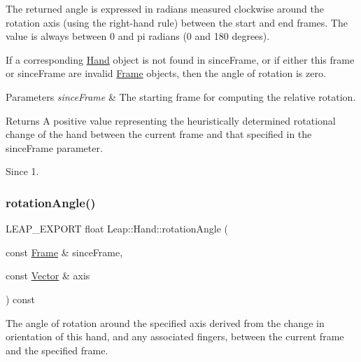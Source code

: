 \begin{DoxyCodeInclude}
\end{DoxyCodeInclude}


The returned angle is expressed in radians measured clockwise around the rotation axis (using the right-\/hand rule) between the start and end frames. The value is always between 0 and pi radians (0 and 180 degrees).

If a corresponding \hyperlink{class_leap_1_1_hand}{Hand} object is not found in since\+Frame, or if either this frame or since\+Frame are invalid \hyperlink{class_leap_1_1_frame}{Frame} objects, then the angle of rotation is zero.


\begin{DoxyParams}{Parameters}
{\em since\+Frame} & The starting frame for computing the relative rotation. \\
\hline
\end{DoxyParams}
\begin{DoxyReturn}{Returns}
A positive value representing the heuristically determined rotational change of the hand between the current frame and that specified in the since\+Frame parameter. 
\end{DoxyReturn}
\begin{DoxySince}{Since}
1. 
\end{DoxySince}
\mbox{\label{class_leap_1_1_hand_aedf018db2f7ead885e78c9d88bc9d3e3}} 
\subsubsection{\texorpdfstring{rotation\+Angle()}{rotationAngle()}\hspace{0.1cm}{\footnotesize\ttfamily [2/2]}}
{\footnotesize\ttfamily L\+E\+A\+P\+\_\+\+E\+X\+P\+O\+RT float Leap\+::\+Hand\+::rotation\+Angle (\begin{DoxyParamCaption}\item[{const \hyperlink{class_leap_1_1_frame}{Frame} \&}]{since\+Frame,  }\item[{const \hyperlink{struct_leap_1_1_vector}{Vector} \&}]{axis }\end{DoxyParamCaption}) const}

The angle of rotation around the specified axis derived from the change in orientation of this hand, and any associated fingers, between the current frame and the specified frame.


